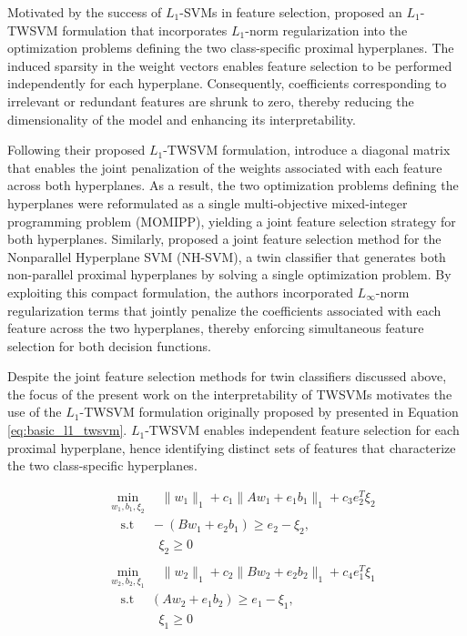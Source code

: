 \documentclass[12pt]{report} %
\begin{document}
Motivated by the success of $L_1$-SVMs in feature selection, \cite{bai2014novel} proposed an $L_1$-TWSVM formulation that incorporates $L_1$-norm regularization into the optimization problems defining the two class-specific proximal hyperplanes. The induced sparsity in the weight vectors enables feature selection to be performed independently for each hyperplane. Consequently, coefficients corresponding to irrelevant or redundant features are shrunk to zero, thereby reducing the dimensionality of the model and enhancing its interpretability.

Following their proposed $L_1$-TWSVM formulation, \cite{bai2014novel} introduce a diagonal matrix that enables the joint penalization of the weights associated with each feature across both hyperplanes. As a result, the two optimization problems defining the hyperplanes were reformulated as a single multi-objective mixed-integer programming problem (MOMIPP), yielding a joint feature selection strategy for both hyperplanes. Similarly, \cite{maldonado2017synchronized} proposed a joint feature selection method for the Nonparallel Hyperplane SVM (NH-SVM), a twin classifier that generates both non-parallel proximal hyperplanes by solving a single optimization problem. By exploiting this compact formulation, the authors incorporated $L_\infty$-norm regularization terms that jointly penalize the coefficients associated with each feature across the two hyperplanes, thereby enforcing simultaneous feature selection for both decision functions.

\newpage

Despite the joint feature selection methods for twin classifiers discussed above, the focus of the present work on the interpretability of TWSVMs motivates the use of the $L_1$-TWSVM formulation originally proposed by \cite{bai2014novel} presented in Equation \ref{eq:basic_l1_twsvm}. $L_1$-TWSVM enables independent feature selection for each proximal hyperplane, hence identifying distinct sets of features that characterize the two class-specific hyperplanes.

\begin{subequations}
\label{eq:basic_l1_twsvm}
\begin{align}
& \min_{w_1, b_1, \xi_2} \quad \|w_1\|_1 + c_1\|Aw_1+e_1b_1\|_1 + c_3e_2^T\xi_2 \\
& \quad \text{s.t } \quad -(Bw_1+e_2b_1) \geq e_2 - \xi_2,\nonumber \\
& \quad \quad \quad \quad \xi_2 \geq 0 \nonumber\\
\nonumber \\[2ex]
& \min_{w_2, b_2, \xi_1} \quad \|w_2\|_1 + c_2\|Bw_2+e_2b_2\|_1 + c_4e_1^T\xi_1 \\
& \quad \text{s.t } \quad (Aw_2+e_1b_2) \geq e_1 - \xi_1, \nonumber\\
& \quad \quad \quad \quad \xi_1 \geq 0 \nonumber
\end{align}
\end{subequations}
\end{document}
